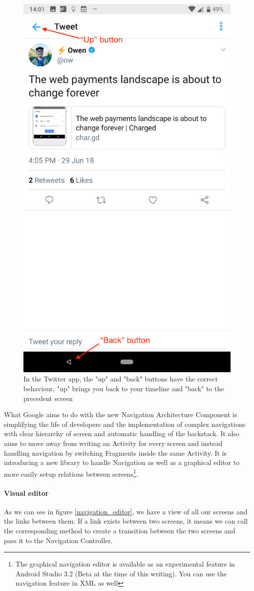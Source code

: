 \documentclass[twoside, openright,11pt,a4paper]{book}
\begin{document}
\begin{figure}[H]
\begin{center}
	\includegraphics[width=.5\textwidth]{assets/twitter_app_up_back}
	\caption[Up and Back buttons in Twitter app]{In the Twitter app, the "up" and "back" buttons have the correct behaviour, "up" brings you back to your timeline and "back" to the precedent screen}
	\label{twitter_up_back_img}
\end{center}
\end{figure}

What Google aims to do with the new Navigation Architecture Component\cite{android:doc:jetpack:navigation} is simplifying the life of developers and the implementation of complex navigations with clear hierarchy of screen and automatic handling of the backstack\cite{android:video:io2018:navigation}. It also aims to move away from writing an Activity for every screen and instead handling navigation by switching Fragments inside the same Activity. It is introducing a new library to handle Navigation as well as a graphical editor to more easily setup relations between screens\footnote{The graphical navigation editor is available as an experimental feature in Android Studio 3.2 (Beta at the time of this writing). You can use the navigation feature in XML as well}.\\


\paragraph{Visual editor}
As we can see in figure \ref{navigation_editor}, we have a view of all our screens and the links between them. If a link exists between two screens, it means we can call the corresponding method to create a transition between the two screens and pass it to the Navigation Controller.\\
\end{document}
